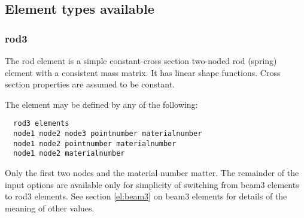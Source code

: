\documentclass[12pt]{article}
\newcommand*{\command}[1]{\textsf{#1}}
\begin{document}
\subsection{Element types available}

\subsubsection{\command{rod3}}\label{el:rod3}
The \command{rod} element is a simple constant-cross section two-noded rod (spring) element with a consistent mass matrix.  It has linear shape functions. Cross section properties are assumed to be constant.

The element may be defined by any of the following:\\
\begin{lstlisting}
  rod3 elements 
  node1 node2 node3 pointnumber materialnumber 
  node1 node2 pointnumber materialnumber 
  node1 node2 materialnumber
\end{lstlisting}
Only the first two nodes and the material number matter. The remainder of the input options are available only for simplicity of switching from \command{beam3} elements to \command{rod3} elements. See section \ref{el:beam3} on \command{beam3} elements for details of the meaning of other values.
\end{document}
